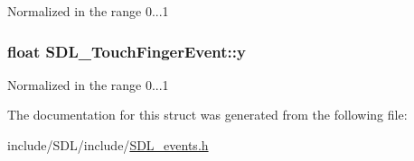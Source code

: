 Normalized in the range 0...1 \hypertarget{struct_s_d_l___touch_finger_event_ac2bb8af638d2927a8e13f6ffe8f9384e}{
\subsubsection[{y}]{\setlength{\rightskip}{0pt plus 5cm}float S\-D\-L\-\_\-\-Touch\-Finger\-Event\-::y}}\label{struct_s_d_l___touch_finger_event_ac2bb8af638d2927a8e13f6ffe8f9384e}
Normalized in the range 0...1 

The documentation for this struct was generated from the following file\-:\begin{DoxyCompactItemize}
\item 
include/\-S\-D\-L/include/\hyperlink{_s_d_l__events_8h}{S\-D\-L\-\_\-events.\-h}\end{DoxyCompactItemize}
